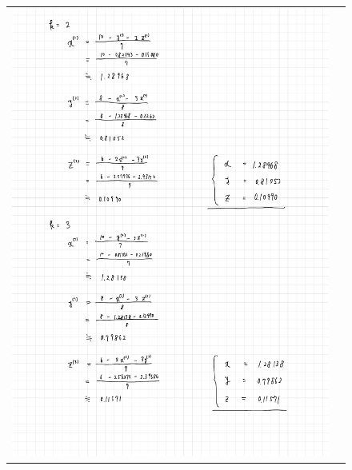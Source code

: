 \documentclass[a4paper, titlepage]{jsarticle}
\begin{document}
\begin{figure}[ht]
\begin{tabular}{cc}
\begin{minipage}[t]{8.2cm}
						\includegraphics[keepaspectratio, scale=0.4]{GaussSeidel_2.pdf}
					\end{minipage}
				\end{tabular}
			\end{figure}
\end{document}
